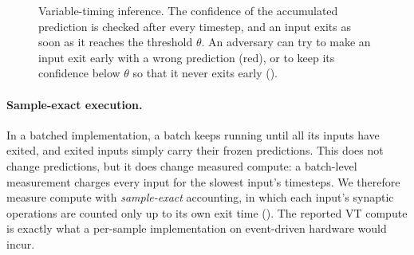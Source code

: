 \begin{figure}[htbp]
    \centering
    \caption[Variable-timing inference]{Variable-timing inference. The confidence of the accumulated prediction is checked after every timestep, and an input exits as soon as it reaches the threshold $\theta$. An adversary can try to make an input exit early with a wrong prediction (red), or to keep its confidence below $\theta$ so that it never exits early ().}
    \label{fig:vt-mechanism}
\end{figure}

\paragraph{Sample-exact execution.} In a batched implementation, a batch keeps running until all its inputs have exited, and exited inputs simply carry their frozen predictions. This does not change predictions, but it does change measured compute: a batch-level measurement charges every input for the slowest input's timesteps. We therefore measure compute with \emph{sample-exact} accounting, in which each input's synaptic operations are counted only up to its own exit time (). The reported VT compute is exactly what a per-sample implementation on event-driven hardware would incur.

